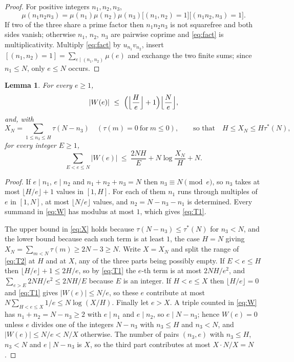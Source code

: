 \documentclass[11pt,a4paper]{article}
\theoremstyle{plain}
\newtheorem{lemma}[theorem]{Lemma}
\theoremstyle{remark}
\newcommand{\taustar}{\tau^{*}}
\begin{document}
\begin{proof}
For positive integers $n_1,n_2,n_3$,
\begin{equation}\label{eq:fact}
  \mu(n_1n_2n_3)=\mu(n_1)\mu(n_2)\mu(n_3)\bigl[(n_1,n_2)=1\bigr]\bigl[(n_1n_2,n_3)=1\bigr].
\end{equation}
If two of the three share a prime factor then $n_1n_2n_3$ is not squarefree and both sides vanish;
otherwise $n_1$, $n_2$, $n_3$ are pairwise coprime and \eqref{eq:fact} is multiplicativity.
Multiply \eqref{eq:fact} by $u_{n_1}v_{n_2}$, insert
$[(n_1,n_2)=1]=\sum_{e\mid(n_1,n_2)}\mu(e)$ and exchange the two finite sums; since $n_1\le N$, only
$e\le N$ occurs.
\end{proof}

\begin{lemma}\label{lem:tail}
For every $e\ge1$,
\begin{equation}\label{eq:T1}
  |W(e)|\ \le\ \Bigl(\Bigl\lfloor\frac He\Bigr\rfloor+1\Bigr)\Bigl\lfloor\frac Ne\Bigr\rfloor,
\end{equation}
and, with
\begin{equation}\label{eq:X}
  X_N=\sum_{1\le n_3\le H}\tau(N-n_3)\quad(\tau(m)=0\ \text{for}\ m\le0),
  \qquad\text{so that}\quad H\le X_N\le H\taustar(N),
\end{equation}
for every integer $E\ge1$,
\begin{equation}\label{eq:T2}
  \sum_{E<e\le N}|W(e)|\ \le\ \frac{2NH}{E}+N\log\frac{X_N}{H}+N.
\end{equation}
\end{lemma}

\begin{proof}
If $e\mid n_1$, $e\mid n_2$ and $n_1+n_2+n_3=N$ then $n_3\equiv N\pmod e$, so $n_3$ takes at most
$\lfloor H/e\rfloor+1$ values in $[1,H]$. For each of them $n_1$ runs through multiples of $e$ in
$[1,N]$, at most $\lfloor N/e\rfloor$ values, and $n_2=N-n_3-n_1$ is determined. Every summand in
\eqref{eq:W} has modulus at most $1$, which gives \eqref{eq:T1}.

The upper bound in \eqref{eq:X} holds because $\tau(N-n_3)\le\taustar(N)$ for $n_3<N$, and the lower
bound because each such term is at least $1$, the case $H=N$ giving
$X_N=\sum_{m<N}\tau(m)\ge2N-3\ge N$. Write $X=X_N$ and split the range of \eqref{eq:T2} at $H$ and at
$X$, any of the three parts being possibly empty. If
$E<e\le H$ then $\lfloor H/e\rfloor+1\le 2H/e$, so by \eqref{eq:T1} the $e$-th term is at most
$2NH/e^{2}$, and $\sum_{e>E}2NH/e^{2}\le 2NH/E$ because $E$ is an integer. If $H<e\le X$ then
$\lfloor H/e\rfloor=0$ and \eqref{eq:T1} gives $|W(e)|\le N/e$, so these $e$ contribute at most
$N\sum_{H<e\le X}1/e\le N\log(X/H)$. Finally let $e>X$. A triple counted in \eqref{eq:W} has
$n_1+n_2=N-n_3\ge2$ with $e\mid n_1$ and $e\mid n_2$, so $e\mid N-n_3$; hence $W(e)=0$ unless $e$
divides one of the integers $N-n_3$ with $n_3\le H$ and $n_3<N$, and
$|W(e)|\le N/e<N/X$ otherwise. The number of pairs $(n_3,e)$ with $n_3\le H$, $n_3<N$ and
$e\mid N-n_3$ is $X$, so the third part contributes at most $X\cdot N/X=N$.
\end{proof}
\end{document}
